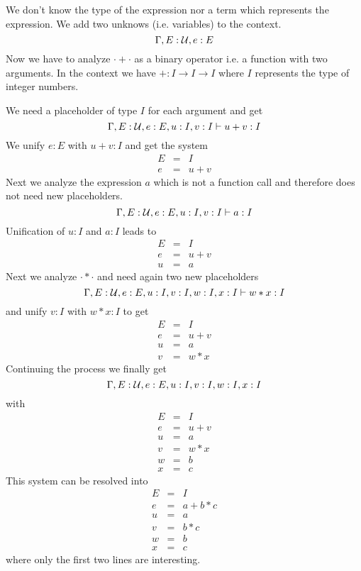 We don't know the type of the expression nor a term which
represents the expression. We add two unknows (i.e. variables) to the context.
%
$$
\Gamma, E: {\cal{U}}, e: E
$$
%
Now we have to analyze $\cdot + \cdot$ as a binary operator i.e. a function
with two arguments. In the context we have $+ : I \to I \to I$ where $I$
represents the type of integer numbers.

We need a placeholder of type $I$ for each argument and get
$$
%
\Gamma,  E: \Any, e: E, u:I, v:I \vdash u + v: I
$$
%
We unify $e:E$ with $u+v:I$ and get the system
$$
%
\begin{array}{lll}
  E &=& I
  \\
  e &=& u + v
\end{array}
$$
%
Next we analyze the expression $a$ which is not a function call and therefore
does not need new placeholders.
$$
%
\Gamma,  E: \Any, e: E, u:I, v:I \vdash a:I
$$
%
Unification of $u:I$ and $a:I$ leads to
$$
%
\begin{array}{lll}
  E &=& I
  \\
  e &=& u + v
  \\
  u &=& a
\end{array}
$$
%
Next we analyze $\cdot * \cdot$ and need again two new placeholders
$$
%
\Gamma,  E: \Any, e: E, u:I, v:I, w:I, x:I \vdash w * x: I
$$
%
and unify $v:I$ with $ w * x: I$ to get
$$
%
\begin{array}{lll}
  E &=& I
  \\
  e &=& u + v
  \\
  u &=& a
  \\
  v &=& w * x
\end{array}
$$
%
Continuing the process we finally get
$$
%
\Gamma,  E: \Any, e: E, u:I, v:I, w:I, x:I
$$
%
with
$$
%
\begin{array}{lll}
  E &=& I
  \\
  e &=& u + v
  \\
  u &=& a
  \\
  v &=& w * x
  \\
  w &=& b
  \\
  x &=& c
\end{array}
$$
%
This system can be resolved into
$$
%
\begin{array}{lll}
  E &=& I
  \\
  e &=& a + b * c
  \\
  u &=& a
  \\
  v &=& b * c
  \\
  w &=& b
  \\
  x &=& c
\end{array}
$$
%
where only the first two lines are interesting.





